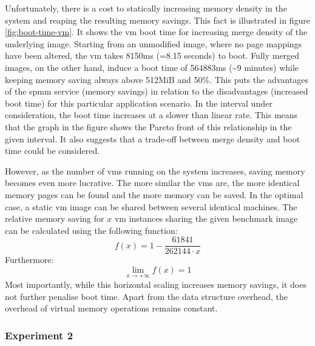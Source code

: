 Unfortunately, there is a cost to statically increasing memory density in the system and reaping the resulting memory savings.
This fact is illustrated in figure \ref{fig:boot-time-vm}.
It shows the \ac{vm} boot time for increasing merge density of the underlying image.
Starting from an unmodified image, where no page mappings have been altered, the \ac{vm} takes 8150ms (=8.15 seconds) to boot.
Fully merged images, on the other hand, induce a boot time of 564883ms (\textasciitilde{}9 minutes) while keeping memory saving always above 512MiB and 50\%.
This puts the advantages of the \ac{spmm} service (memory savings) in relation to the disadvantages (increased boot time) for this particular application scenario.
In the interval under consideration, the boot time increases at a slower than linear rate.
This means that the graph in the figure shows the Pareto front of this relationship in the given interval.
It also suggests that a trade-off between merge density and boot time could be considered.

However, as the number of \acp{vm} running on the system increases, saving memory becomes even more lucrative.
The more similar the \acp{vm} are, the more identical memory pages can be found and the more memory can be saved.
In the optimal case, a static \ac{vm} image can be shared between several identical machines.
The relative memory saving for $x$ \ac{vm} instances sharing the given benchmark image can be calculated using the following function:
$$f(x) = 1 - \frac{61841}{262144 \cdot x}$$
Furthermore:
$$ \lim_{x \to +\infty} f(x) = 1$$
Most importantly, while this horizontal scaling increases memory savings, it does not further penalise boot time.
Apart from the  data structure overhead, the overhead of virtual memory operations remains constant.

%  

\subsubsection*{Experiment 2}
\label{subsubsec:ex2}

